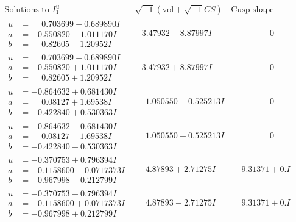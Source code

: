 \documentclass[1p]{elsarticle_modified}
\theoremstyle{definition}
\newcommand{\I}{\sqrt{-1}}
\begin{document}
$$\begin{array}{c|c|c}  
\text{Solutions to }I^u_{1}& \I (\text{vol} + \sqrt{-1}CS) & \text{Cusp shape}\\
 \hline 
\begin{aligned}
u &= \phantom{-}0.703699 + 0.689890 I \\
a &= -0.550820 - 1.011170 I \\
b &= \phantom{-}0.82605 - 1.20952 I\end{aligned}
 & -3.47932 - 8.87997 I & \phantom{-0.000000 } 0 \\ \hline\begin{aligned}
u &= \phantom{-}0.703699 - 0.689890 I \\
a &= -0.550820 + 1.011170 I \\
b &= \phantom{-}0.82605 + 1.20952 I\end{aligned}
 & -3.47932 + 8.87997 I & \phantom{-0.000000 } 0 \\ \hline\begin{aligned}
u &= -0.864632 + 0.681430 I \\
a &= \phantom{-}0.08127 + 1.69538 I \\
b &= -0.422840 + 0.530363 I\end{aligned}
 & \phantom{-}1.050550 - 0.525213 I & \phantom{-0.000000 } 0 \\ \hline\begin{aligned}
u &= -0.864632 - 0.681430 I \\
a &= \phantom{-}0.08127 - 1.69538 I \\
b &= -0.422840 - 0.530363 I\end{aligned}
 & \phantom{-}1.050550 + 0.525213 I & \phantom{-0.000000 } 0 \\ \hline\begin{aligned}
u &= -0.370753 + 0.796394 I \\
a &= -0.1158600 - 0.0717373 I \\
b &= -0.967998 - 0.212799 I\end{aligned}
 & \phantom{-}4.87893 + 2.71275 I & \phantom{-}9.31371 + 0. I\phantom{ +0.000000I} \\ \hline\begin{aligned}
u &= -0.370753 - 0.796394 I \\
a &= -0.1158600 + 0.0717373 I \\
b &= -0.967998 + 0.212799 I\end{aligned}
 & \phantom{-}4.87893 - 2.71275 I & \phantom{-}9.31371 + 0. I\phantom{ +0.000000I} \\ \hline\begin{aligned}

\end{aligned}
\end{array}$$
\end{document}
